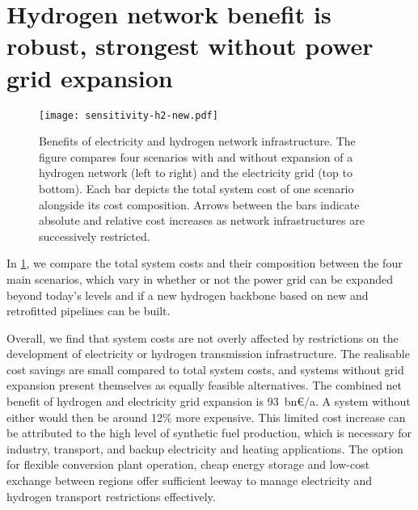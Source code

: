 
\section*{Hydrogen network benefit is robust, strongest without power grid expansion}
\label{sec:h2}

\begin{figure}
    \centering
    \texttt{[image: sensitivity-h2-new.pdf]}
    \caption{Benefits of electricity and hydrogen network infrastructure. The
    figure compares four scenarios with and without expansion of a hydrogen
    network (left to right) and the electricity grid (top to bottom). Each bar
    depicts the total system cost of one scenario alongside its cost
    composition. Arrows between the bars indicate absolute and relative cost
    increases as network infrastructures are successively restricted.}
    \label{fig:sensitivity-h2}
\end{figure}

In \cref{fig:sensitivity-h2}, we compare the total system costs and their
composition between the four main scenarios, which vary in whether or not the
power grid can be expanded beyond today's levels and if a new hydrogen backbone
based on new and retrofitted pipelines can be built.


Overall, we find that system costs are not overly affected by restrictions on
the development of electricity or hydrogen transmission infrastructure. The
realisable cost savings are small compared to total system costs, and systems
without grid expansion present themselves as equally feasible alternatives. The
combined net benefit of hydrogen and electricity grid expansion is 93~bn\euro/a.
A system without either would then be around 12\% more expensive. This limited
cost increase can be attributed to the high level of synthetic fuel production,
which is necessary for industry, transport, and backup electricity and heating
applications. The option for flexible conversion plant operation, cheap energy
storage and low-cost exchange between regions offer sufficient leeway to manage
electricity and hydrogen transport restrictions effectively.


